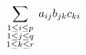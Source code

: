 $$
\sum_{
\scriptstyle 1 \le i \le p \atop {
\scriptstyle 1 \le j \le q \atop 
\scriptstyle 1 \le k \le r}}
a_{ij}b_{jk}c_{ki}
$$

\bye


